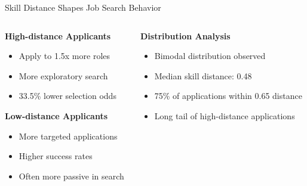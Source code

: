 \documentclass{beamer}
\begin{document}
\begin{frame}{Skill Distance Shapes Job Search Behavior}
\begin{columns}
\begin{column}{0.48\textwidth}
\textbf{High-distance Applicants}
\begin{itemize}
    \item Apply to 1.5x more roles
    \item More exploratory search
    \item 33.5\% lower selection odds
\end{itemize}

\textbf{Low-distance Applicants}
\begin{itemize}
    \item More targeted applications
    \item Higher success rates
    \item Often more passive in search
\end{itemize}
\end{column}
\begin{column}{0.48\textwidth}
\begin{tcolorbox}[colback=boxbackground,colframe=boxframe,sharp corners]
\textbf{Distribution Analysis}
\begin{itemize}
    \item Bimodal distribution observed
    \item Median skill distance: 0.48
    \item 75\% of applications within 0.65 distance
    \item Long tail of high-distance applications
\end{itemize}
\end{tcolorbox}
\end{column}
\end{columns}
\end{frame}
\end{document}
